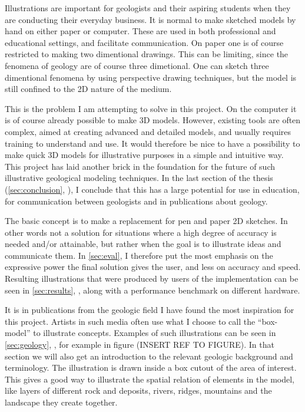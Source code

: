 \documentclass[a4paper,12pt]{report}
\newcommand{\secref}[1]{\autoref{#1}, \nameref{#1}}
\begin{document}
	
Illustrations are important for geologists and their aspiring students when they are conducting their everyday business. It is normal to make sketched models by hand on either paper or computer. These are used in both professional and educational settings, and facilitate communication. On paper one is of course restricted to making two dimentional drawings. This can be limiting, since the fenomena of geology are of course three dimetional. One can sketch three dimentional fenomena by using perspective drawing techniques, but the model is still confined to the 2D nature of the medium.

This is the problem I am attempting to solve in this project. On the computer it is of course already possible to make 3D models. However, existing tools are often complex, aimed at creating advanced and detailed models, and usually requires training to understand and use. It would therefore be nice to have a possibility to make quick 3D models for illustrative purposes in a simple and intuitive way. This project has laid another brick in the foundation for the future of such illustrative geological modeling techniques. In the last section of the thesis (\secref{sec:conclusion}), I conclude that this has a large potential for use in education, for communication between geologists and in publications about geology.

The basic concept is to make a replacement for pen and paper 2D sketches. In other words not a solution for situations where a high degree of accuracy is needed and/or attainable, but rather when the goal is to illustrate ideas and communicate them. In \secref{sec:eval} I therefore put the most emphasis on the expressive power the final solution gives the user, and less on accuracy and speed. Resulting illustrations that were produced by users of the implementation can be seen in \secref{sec:results}, along with a performance benchmark on different hardware.

It is in publications from the geologic field I have found the most inspiration for this project. Artists in such media often use what I choose to call the ``box-model'' to illustrate concepts. Examples of such illustrations can be seen in \secref{sec:geology}, for example in figure (INSERT REF TO FIGURE). In that section we will also get an introduction to the relevant geologic background and terminology. The illustration is drawn inside a box cutout of the area of interest. This gives a good way to illustrate the spatial relation of elements in the model, like layers of different rock and deposits, rivers, ridges, mountains and the landscape they create together. 
\end{document}
